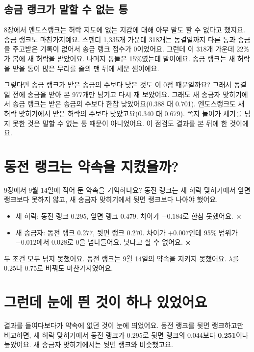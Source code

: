 \subsection*{송금 랭크가 말할 수 없는 통}

8장에서 엔도스랭크는 허락 지도에 없는 지갑에 대해 아무 말도 할 수 없다고 했지요.
송금 랭크도 마찬가지예요.
스펜더 1,335개 가운데 318개는 동결일까지 다른 통과 송금을 주고받은 기록이 없어서 송금 랭크 점수가 0이었어요.
그런데 이 318개 가운데 22\%가 봄에 새 허락을 받았어요.
나머지 통들은 15\%였는데 말이에요.
송금 랭크는 새 허락을 받을 통이 많은 무리를 줄의 맨 뒤에 세운 셈이에요.

그렇다면 송금 랭크가 받은 송금의 수보다 낮은 것도 이 0점 때문일까요?
그래서 동결일 전에 송금을 받아 본 977개만 남기고 다시 재 보았어요.
그래도 새 송금자 맞히기에서 송금 랭크는 받은 송금의 수보다 한참 낮았어요(0.388 대 0.701).
엔도스랭크도 새 허락 맞히기에서 받은 허락의 수보다 낮았고요(0.340 대 0.679).
쪽지 놀이가 세기를 넘지 못한 것은 말할 수 없는 통 때문이 아니었어요.
이 점검도 결과를 본 뒤에 한 것이에요.

\section{동전 랭크는 약속을 지켰을까?}

9장에서 9월 14일에 적어 둔 약속을 기억하나요?
동전 랭크는 새 허락 맞히기에서 앞면 랭크보다 못하지 않고, 새 송금자 맞히기에서 뒷면 랭크보다 나아야 했어요.

\begin{itemize}
\item 새 허락: 동전 랭크 0.295, 앞면 랭크 0.479. 차이가 $-0.184$로 한참 못했어요. \textcolor{roseline}{\textbf{×}}
\item 새 송금자: 동전 랭크 0.277, 뒷면 랭크 0.270. 차이가 $+0.007$인데 95\% 범위가 $-0.012$에서 $0.028$로 0을 넘나들어요. 낫다고 할 수 없어요. \textcolor{roseline}{\textbf{×}}
\end{itemize}

두 조건 모두 넘지 못했어요.
동전 랭크는 9월 14일의 약속을 지키지 못했어요.
$\lambda$를 0.25나 0.75로 바꿔도 마찬가지였어요.

\section{그런데 눈에 띈 것이 하나 있었어요}

결과를 들여다보다가 약속에 없던 것이 눈에 띄었어요.
동전 랭크를 뒷면 랭크하고만 비교하면, 새 허락 맞히기에서 동전 랭크가 0.295로 뒷면 랭크의 0.044보다 \textbf{0.251}이나 높았어요.
새 송금자 맞히기에서는 뒷면 랭크와 비슷했고요.


